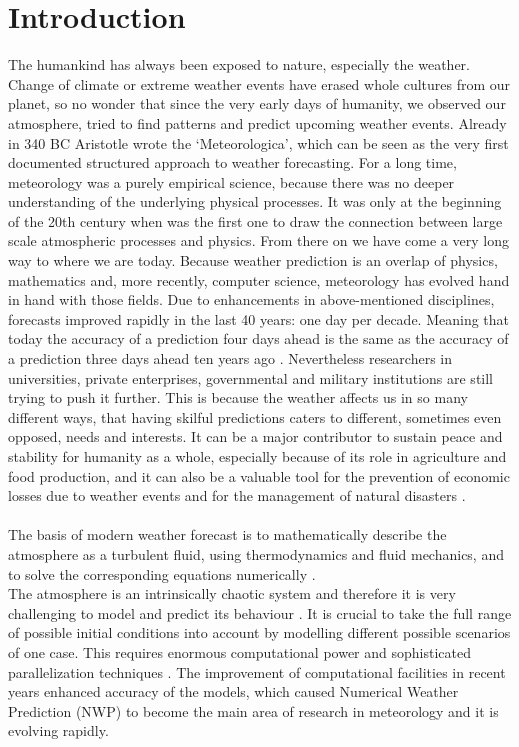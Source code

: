 \chapter{Introduction} 

The humankind has always been exposed to nature, especially the weather.  Change of climate or extreme weather events have erased whole cultures from our planet, so no wonder that since the very early days of humanity, we observed our atmosphere, tried to find patterns and predict upcoming weather events.  Already in 340 BC Aristotle wrote the `Meteorologica', which can be seen as the very first documented structured approach to weather forecasting.
For a long time, meteorology was a purely empirical science, because there was no deeper understanding of the underlying physical processes. It was only at the beginning of the 20th century when \citeauthor{abbe1901physical} \cite{abbe1901physical} was the first one to draw the connection between large scale atmospheric processes and physics.
From there on we have come a very long way to where we are today. Because weather prediction is an overlap of physics, mathematics and, more recently, computer science, meteorology has evolved hand in hand with those fields.
Due to enhancements in above-mentioned disciplines, forecasts improved rapidly in the last 40 years: one day per decade. Meaning that today the accuracy of a prediction four days ahead is the same as the accuracy of a prediction three days ahead ten years ago \parencite{bauer2015quiet}. Nevertheless researchers in universities, private enterprises, governmental and military institutions are still trying to push it further. This is because the weather affects us in so many different ways, that having skilful predictions caters to different, sometimes even opposed, needs and interests. It can be a major contributor to sustain peace and stability for humanity as a whole, especially because of its role in agriculture and food production, and it can also be a valuable tool for the prevention of economic losses due to weather events and for the management of natural disasters \cite{webster2013meteorology}.\\ \\
The basis of modern weather forecast is to  mathematically describe the atmosphere as a turbulent fluid, using thermodynamics and fluid mechanics, and to solve the corresponding equations numerically \cite{coiffier2011fundamentals, batkai2016mathematical, phillips1960problem}.\\
The atmosphere is an intrinsically chaotic system and therefore it is very challenging to model and predict its behaviour \cite{lorenz1963deterministic}. It is  crucial to take the full range of possible initial conditions into account by modelling different possible scenarios of one case. This requires enormous computational power and sophisticated parallelization techniques \cite{batkai2016mathematical, leutbecher2008ensemble}. The improvement of computational facilities in recent years enhanced accuracy of the models, which caused Numerical Weather Prediction (NWP) to become the main area of research in meteorology and it is evolving rapidly. \\ \\
